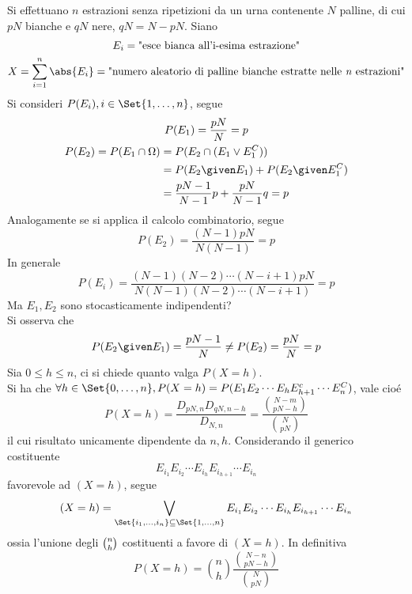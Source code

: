 \documentclass{subfiles}
\begin{document}
Si effettuano \(n\) estrazioni senza ripetizioni da un urna contenente \(N\) palline, di cui \(pN\) bianche e \(qN\) nere, \(qN = N - pN\).
Siano
\[\begin{gathered}
        E_{i} = \text{"esce bianca all'i-esima estrazione"} \\
        X = \sum\limits_{i = 1}^{n}{\abs{E_{i}}} = \text{"numero aleatorio di palline bianche estratte nelle \emph{n} estrazioni"}
    \end{gathered}\]
Si consideri \(P(E_{i}), i \in \Set{1, \dots, n}\), segue
\[\begin{gathered}
        P(E_{1}) = \frac{pN}{N} = p     \\
        \begin{aligned}
            P(E_{2}) = P(E_{1} \cap \Omega) & = P(E_{2} \cap (E_{1} \lor E_{1}^{C}))              \\
                                            & = P(E_{2} \given E_{1}) + P(E_{2} \given E_{1}^{C}) \\
                                            & = \frac{pN - 1}{N - 1}p + \frac{pN}{N - 1}q = p     \\
        \end{aligned}
    \end{gathered}\]
Analogamente se si applica il calcolo combinatorio, segue
\[
    P(E_{2}) = \frac{(N - 1)pN}{N(N - 1)} = p
\]
In generale
\[
    P(E_{i}) = \frac{(N - 1)(N - 2) \cdots (N - i + 1)pN}{N(N - 1)(N - 2) \cdots (N - i + 1)} = p
\]
Ma \(E_{1}, E_{2}\) sono stocasticamente indipendenti?\\
Si osserva che
\[
    P(E_{2} \given E_{1}) = \frac{pN - 1}{N} \neq P(E_{2}) = \frac{pN}{N} = p
\]
Sia \(0 \le h \le n\), ci si chiede quanto valga \(P(X = h)\).\\
Si ha che \(\forall h \in \Set{0, \dots, n}, P(X = h) = P(E_{1}E_{2} \cdots E_{h} E_{h + 1}^{c} \cdots E_{n}^{C})\), vale cioé
\[
    P(X = h) = \frac{D_{pN, n} D_{qN, n - h}}{D_{N, n}} = \frac{\binom{N - m}{pN - h}}{\binom{N}{pN}}
\]
il cui risultato unicamente dipendente da \(n, h\).
\clearpage
Considerando il generico costituente
\[
    E_{i_{1}}E_{i_{2}} \cdots E_{i_{h}}E_{i_{h + 1}} \cdots E_{i_{n}}
\]
favorevole ad \((X = h)\), segue
\[
    (X = h) = \bigvee\limits_{\Set{i_{1}, \dots, i_{n}} \subseteq \Set{1, \dots, n}}{E_{i_{1}}E_{i_{2}} \cdots E_{i_{h}}E_{i_{h + 1}} \cdots E_{i_{n}}}
\]
ossia l'unione degli \(\tbinom{n}{h}\) costituenti a favore di \((X = h)\).
In definitiva
\begin{equation}
    P(X = h) = \binom{n}{h} \frac{\binom{N - n}{pN - h}}{\binom{N}{pN}}
\end{equation}
\end{document}
